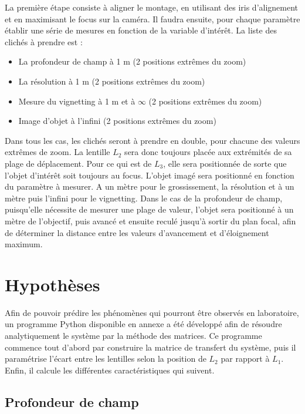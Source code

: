 \documentclass[11pt,letterpaper]{article}
\begin{document}
La première étape consiste à aligner le montage, en utilisant des iris d'alignement et en maximisant le focus sur la caméra. Il faudra ensuite, pour chaque paramètre établir une série de mesures en fonction de la variable d'intérêt. La liste des clichés à prendre est : 

\begin{itemize}
    \item La profondeur de champ à 1 m (2 positions extrêmes du zoom)
    \item La résolution à 1 m (2 positions extrêmes du zoom)
    \item Mesure du vignetting à 1 m et à $\infty$ (2 positions extrêmes du zoom)
    \item Image d’objet à l’infini (2 positions extrêmes du zoom)
\end{itemize}

Dans tous les cas, les clichés seront à prendre en double, pour chacune des valeurs extrêmes de zoom. La lentille $L_2$ sera donc toujours placée aux extrémités de sa plage de déplacement. Pour ce qui est de $L_3$, elle sera positionnée de sorte que l'objet d'intérêt soit toujours au focus. L'objet imagé sera positionné en fonction du paramètre à mesurer. A un mètre pour le grossissement, la résolution et à un mètre puis l'infini pour le vignetting. Dans le cas de la profondeur de champ, puisqu'elle nécessite de mesurer une plage de valeur, l'objet sera positionné à un mètre de l'objectif, puis avancé et ensuite reculé jusqu'à sortir du plan focal, afin de déterminer la distance entre les valeurs d'avancement et d'éloignement maximum.

\section{Hypothèses}


Afin de pouvoir prédire les phénomènes qui pourront être observés en laboratoire, un
programme Python disponible en annexe a été développé afin de résoudre analytiquement
le système par la méthode des matrices. Ce programme commence tout d'abord par construire
la matrice de transfert du système, puis il paramétrise l'écart entre les lentilles selon
la position de $L_2$ par rapport à $L_1$. Enfin, il calcule les différentes caractéristiques
qui suivent.

\subsection{Profondeur de champ}
\end{document}
